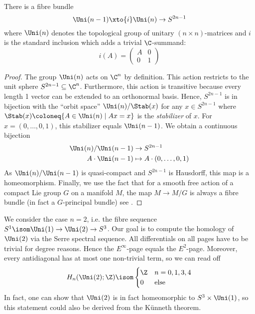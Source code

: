 \begin{lemma}
	There is a fibre bundle
	\begin{equation*}
		\Uni(n - 1) \xto{i} \Uni(n) \to S^{2n - 1}
	\end{equation*}
	where $\Uni(n)$ denotes the topological group of unitary $(n \times n)$-matrices and $i$ is the standard inclusion which adds a trivial $\C$-summand:
	\begin{equation*}
		i(A) = \begin{pmatrix}
			A & 0 \\
			0 & 1
		\end{pmatrix}
	\end{equation*}
\end{lemma}
\begin{proof}
	The group $\Uni(n)$ acts on $\C^n$ by definition.
	This action restricts to the unit sphere $S^{2n - 1} \subseteq \C^n$.
	Furthermore, this action is transitive because every length 1 vector can be extended to an orthonormal basis.
	Hence, $S^{2n - 1}$ is in bijection with the \enquote{orbit space} $\Uni(n) / \Stab(x)$ for any $x \in S^{2n - 1}$ where $\Stab(x) \coloneq \{A \in \Uni(n) \mid Ax = x\}$ is the \emph{stabilizer} of $x$.
	For $x = (0, \ldots, 0, 1)$, this stabilizer equals $\Uni(n - 1)$.
	We obtain a continuous bijection
	\begin{align*}
		\Uni(n) / \Uni(n - 1) &\to S^{2n - 1} \\
		A \cdot \Uni(n - 1) &\mapsto A \cdot (0, \ldots, 0, 1)
	\end{align*}
	As $\Uni(n) / \Uni(n - 1)$ is quasi-compact and $S^{2n - 1}$ is Hausdorff, this map is a homeomorphism.
	Finally, we use the fact that for a smooth free action of a compact Lie group $G$ on a manifold $M$, the map $M \to M / G$ is always a fibre bundle (in fact a $G$-principal bundle) see \cite[Problem 21-6]{lee_introduction_2012}.
\end{proof}
\begin{example}
	We consider the case $n = 2$, i.e. the fibre sequence $S^1 \isom \Uni(1) \to \Uni(2) \to S^3$.
	Our goal is to compute the homology of $\Uni(2)$ via the Serre spectral sequence.
	All differentials on all pages have to be trivial for degree reasons.
	Hence the $E^\infty$-page equals the $E^2$-page.
	Moreover, every antidiagonal has at most one non-trivial term, so we can read off
	\begin{equation*}
		H_n(\Uni(2); \Z) \isom \begin{cases}
			\Z & n = 0, 1, 3, 4 \\
			0  & \text{else}
		\end{cases}
	\end{equation*}
	In fact, one can show that $\Uni(2)$ is in fact homeomorphic to $S^3 \times \Uni(1)$, so this statement could also be derived from the Künneth theorem.
\end{example}
